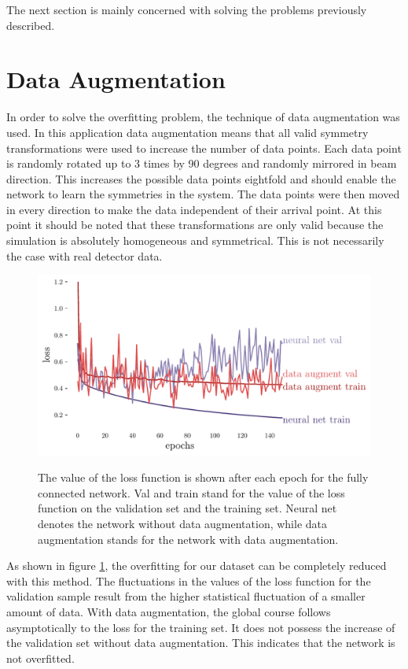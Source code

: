 \documentclass[12pt, a4paper]{thesis}
\begin{document}
The next section is mainly concerned with solving the problems previously
described.

\section{Data Augmentation}
\label{sec:org4a347fb}

In order to solve the overfitting problem, the technique of data augmentation
was used. In this application data augmentation means that all valid symmetry
transformations were used to increase the number of data points. Each data point
is randomly rotated up to 3 times by 90 degrees and randomly mirrored in beam
direction. This increases the possible data points eightfold and should enable
the network to learn the symmetries in the system. The data points were then
moved in every direction to make the data independent of their arrival point. At
this point it should be noted that these transformations are only valid because
the simulation is absolutely homogeneous and symmetrical. This is not
necessarily the case with real detector data.

\begin{figure}[htbp]
\centering
\includegraphics[width=.9\linewidth]{../images/data_augment_loss.pdf}
\label{da_loss}
\caption{The value of the loss function is shown after each epoch for
  the fully connected network. Val and train stand for the value of
  the loss function on the validation set and the training set. Neural
  net denotes the network without data augmentation, while data
  augmentation stands for the network with data augmentation.}
\end{figure} 

As shown in figure \ref{da_loss}, the overfitting for our dataset can be
completely reduced with this method.  The fluctuations in the values
of the loss function for the validation sample result from the higher
statistical fluctuation of a smaller amount of data. With data
augmentation, the global course follows asymptotically to the loss for
the training set. It does not possess the increase of the validation
set without data augmentation. This indicates that the network is not
overfitted.
\end{document}

